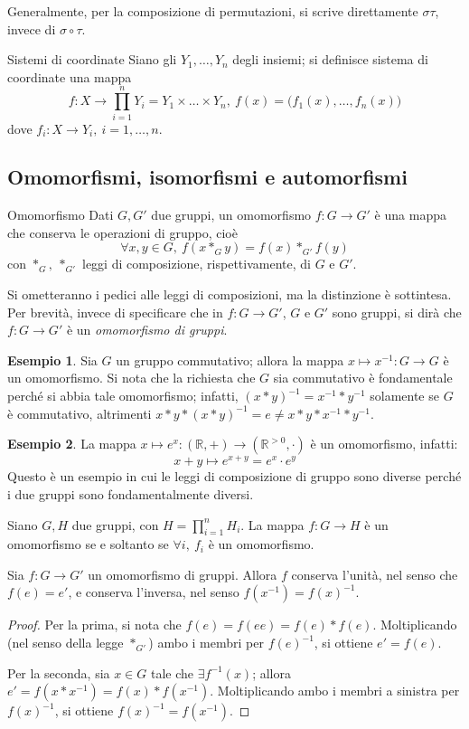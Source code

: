 \documentclass[11pt, a4paper]{scrartcl}
\theoremstyle{definition}
\newtheorem{esempio}{Esempio}
\numberwithin{esempio}{section}
\theoremstyle{definition}
\numberwithin{obs}{section}
\numberwithin{nota}{section}
\numberwithin{equation}{subsection}
\begin{document}
\noindent Generalmente, per la composizione di permutazioni, si scrive direttamente $\sigma \tau $, invece di $\sigma \circ \tau $.
\begin{definizione}
	{Sistemi di coordinate}{}
	Siano gli $Y_1,\ldots, Y_n$ degli insiemi; si definisce sistema di coordinate una mappa 
	\[
	f: X \to \prod _{i=1} ^n Y_i = Y_1 \times \ldots \times Y_n, \ f(x) = \big(f_1(x), \ldots, f_n(x)\big)
	\] 
dove $f_i :X \to Y_i, \ i=1, \ldots, n$.
\end{definizione}
\subsection{Omomorfismi, isomorfismi e automorfismi}
\begin{definizione}
	{Omomorfismo}{}
	Dati $G,G'$ due gruppi, un omomorfismo $f: G \to G'$ \`e una mappa che conserva le operazioni di gruppo, cio\`e
	\[
	\forall  x,y \in G, \ f(x*_G y ) = f(x) *_{G'} f(y)
	\] 
	con $*_G, \ *_{G'} $ leggi di composizione, rispettivamente, di $G$ e $G'$.
\end{definizione}
\noindent Si ometteranno i pedici alle leggi di composizioni, ma la distinzione \`e sottintesa.
Per brevit\`a, invece di specificare che in $f:G \to G'$, $G$ e $G'$ sono gruppi, si dir\`a che $f:G\to G'$ \`e un \textit{omomorfismo di gruppi}.
\begin{esempio}
Sia $G$ un gruppo commutativo; allora la mappa $x \mapsto x^{-1} : G \to G $ \`e un omomorfismo. 
Si nota che la richiesta che $G$ sia commutativo \`e fondamentale perch\'e si abbia tale omomorfismo; infatti, $ (x*y)^{-1} = x ^{-1}*y^{-1} $ solamente se $G$ \`e commutativo, altrimenti $x*y *(x*y)^{-1} = e \neq x*y *x^{-1} *y^{-1} $.
\end{esempio}
\begin{esempio}
 La mappa $x\mapsto e^x : (\mathbb{R}, +) \to (\mathbb{R}^{>0} , \cdot )$ \`e un omomorfismo, infatti:
 \[
 x + y \mapsto e^{x+y} = e^x \cdot e^y
 \] 
Questo \`e un esempio in cui le leggi di composizione di gruppo sono diverse perch\'e i due gruppi sono fondamentalmente diversi. 
\end{esempio}
\begin{prop}
	{}{}
	Siano $G,H$ due gruppi, con $H = \prod_{i=1}^n  H_i$. La mappa $f : G \to H $ \`e un omomorfismo se e soltanto se $\forall i, \ f_i$ \`e un omomorfismo.
\end{prop}
\begin{prop}
	{}{}
	Sia $f:G \to G'$ un omomorfismo di gruppi. Allora $f$ conserva l'unit\`a, nel senso che $f(e) = e' $, e conserva l'inversa, nel senso $f(x^{-1} ) = f(x)^{-1} $.
	\begin{proof}
		Per la prima, si nota che $f(e) = f(ee) = f(e)*f(e)$. Moltiplicando (nel senso della legge $*_{G'} $) ambo i membri per $f(e)^{-1} $, si ottiene $e' = f(e)$.

		Per la seconda, sia $x \in G$ tale che $\exists f^{-1} (x)$; allora $e' = f(x*x^{-1} )= f(x) * f(x^{-1} )$. Moltiplicando ambo i membri a sinistra per $f (x)^{-1} $, si ottiene $f (x) ^{-1} = f(x^{-1} )$.
	\end{proof}
\end{prop}
\end{document}
